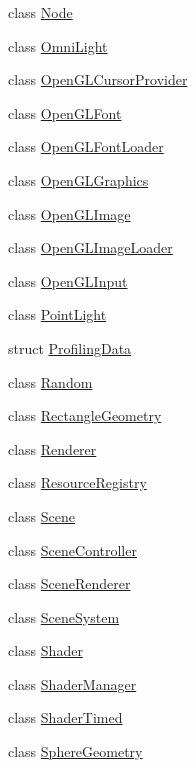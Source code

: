 \begin{DoxyCompactItemize}
class \mbox{\hyperlink{classec_1_1_node}{Node}}
\item 
class \mbox{\hyperlink{classec_1_1_omni_light}{Omni\+Light}}
\item 
class \mbox{\hyperlink{classec_1_1_open_g_l_cursor_provider}{Open\+G\+L\+Cursor\+Provider}}
\item 
class \mbox{\hyperlink{classec_1_1_open_g_l_font}{Open\+G\+L\+Font}}
\item 
class \mbox{\hyperlink{classec_1_1_open_g_l_font_loader}{Open\+G\+L\+Font\+Loader}}
\item 
class \mbox{\hyperlink{classec_1_1_open_g_l_graphics}{Open\+G\+L\+Graphics}}
\item 
class \mbox{\hyperlink{classec_1_1_open_g_l_image}{Open\+G\+L\+Image}}
\item 
class \mbox{\hyperlink{classec_1_1_open_g_l_image_loader}{Open\+G\+L\+Image\+Loader}}
\item 
class \mbox{\hyperlink{classec_1_1_open_g_l_input}{Open\+G\+L\+Input}}
\item 
class \mbox{\hyperlink{classec_1_1_point_light}{Point\+Light}}
\item 
struct \mbox{\hyperlink{structec_1_1_profiling_data}{Profiling\+Data}}
\item 
class \mbox{\hyperlink{classec_1_1_random}{Random}}
\item 
class \mbox{\hyperlink{classec_1_1_rectangle_geometry}{Rectangle\+Geometry}}
\item 
class \mbox{\hyperlink{classec_1_1_renderer}{Renderer}}
\item 
class \mbox{\hyperlink{classec_1_1_resource_registry}{Resource\+Registry}}
\item 
class \mbox{\hyperlink{classec_1_1_scene}{Scene}}
\item 
class \mbox{\hyperlink{classec_1_1_scene_controller}{Scene\+Controller}}
\item 
class \mbox{\hyperlink{classec_1_1_scene_renderer}{Scene\+Renderer}}
\item 
class \mbox{\hyperlink{classec_1_1_scene_system}{Scene\+System}}
\item 
class \mbox{\hyperlink{classec_1_1_shader}{Shader}}
\item 
class \mbox{\hyperlink{classec_1_1_shader_manager}{Shader\+Manager}}
\item 
class \mbox{\hyperlink{classec_1_1_shader_timed}{Shader\+Timed}}
\item 
class \mbox{\hyperlink{classec_1_1_sphere_geometry}{Sphere\+Geometry}}

\end{DoxyCompactItemize}
